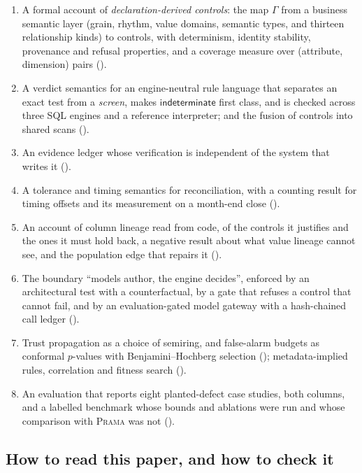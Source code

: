 \documentclass[11pt,a4paper]{article}
\renewcommand{\_}{\oldunderscore\allowbreak}
\theoremstyle{plain}
\theoremstyle{definition}
\theoremstyle{remark}
\newcommand{\IND}{\textsf{indeterminate}}
\newcommand{\Gam}{\Gamma}
\begin{document}
\begin{enumerate}[leftmargin=2em]
  \item A formal account of \emph{declaration-derived controls}: the map $\Gam$ from a business semantic
        layer (grain, rhythm, value domains, semantic types, and thirteen relationship kinds) to controls,
        with determinism, identity stability, provenance and refusal properties, and a coverage measure over
        (attribute, dimension) pairs ().
  \item A verdict semantics for an engine-neutral rule language that separates an exact test from a
        \emph{screen}, makes $\IND$ first class, and is checked across three SQL engines and a reference
        interpreter; and the fusion of controls into shared scans ().
  \item An evidence ledger whose verification is independent of the system that writes it
        ().
  \item A tolerance and timing semantics for reconciliation, with a counting result for timing offsets and
        its measurement on a month-end close ().
  \item An account of column lineage read from code, of the controls it justifies and the ones it must
        hold back, a negative result about what value lineage cannot see, and the population edge that
        repairs it ().
  \item The boundary ``models author, the engine decides'', enforced by an architectural test with a
        counterfactual, by a gate that refuses a control that cannot fail, and by an evaluation-gated
        model gateway with a hash-chained call ledger ().
  \item Trust propagation as a choice of semiring, and false-alarm budgets as conformal $p$-values with
        Benjamini--Hochberg selection (); metadata-implied rules, correlation and fitness
        search ().
  \item An evaluation that reports eight planted-defect case studies, both columns, and a labelled
        benchmark whose bounds and ablations were run and whose comparison with \textsc{Prama} was not
        ().
\end{enumerate}

\subsection{How to read this paper, and how to check it}
\end{document}
